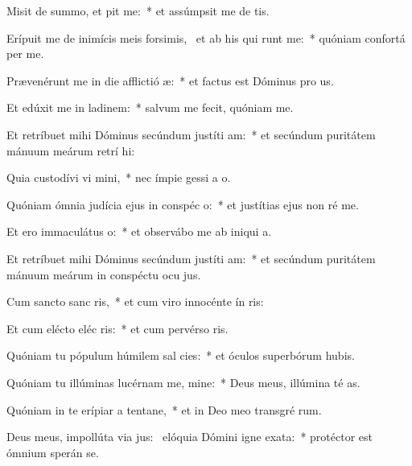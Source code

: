 \item Misit de summo, et pit me:~* et assúmpsit me de  tis.
\item Erípuit me de inimícis meis forsimis,~\pscross{} et ab his qui runt me:~* quóniam confortá  per me.
\item Prævenérunt me in die afflictió æ:~* et factus est Dóminus pro us.
\item Et edúxit me in ladinem:~* salvum me fecit, quóniam  me.
\item Et retríbuet mihi Dóminus secúndum justíti am:~* et secúndum puritátem mánuum meárum retrí hi:
\item Quia custodívi vi mini,~* nec ímpie gessi a  o.
\item Quóniam ómnia judícia ejus in conspéc o:~* et justítias ejus non ré  me.
\item Et ero immaculátus  o:~* et observábo me ab iniqui a.
\item Et retríbuet mihi Dóminus secúndum justíti am:~* et secúndum puritátem mánuum meárum in conspéctu ocu jus.
\item Cum sancto sanc ris,~* et cum viro innocénte ín ris:
\item Et cum elécto eléc ris:~* et cum pervérso ris.
\item Quóniam tu pópulum húmilem sal cies:~* et óculos superbórum hubis.
\item Quóniam tu illúminas lucérnam me, mine:~* Deus meus, illúmina té as.
\item Quóniam in te erípiar a tentane,~* et in Deo meo transgré rum.
\item Deus meus, impollúta via jus:~\pscross{} elóquia Dómini igne exata:~* protéctor est ómnium sperán  se.
